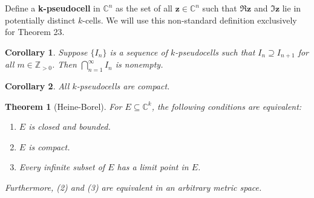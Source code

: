 \documentclass[11pt]{article}
\renewcommand{\vec}[1]{\mathbf{#1}}
\newtheorem{theorem}{Theorem}
\newtheorem{corollary}{Corollary}
\begin{document}
Define a \textbf{k-pseudocell} in $\mathbb{C}^{n}$ as the set of all $\vec{z} \in \mathbb{C}^{n}$ such that $\Re \vec{z}$ and $\Im \vec{z}$ lie in potentially distinct $k$-cells. We will use this non-standard definition exclusively for Theorem 23.

\begin{corollary}
	Suppose $\{ I_{n} \}$ is a sequence of $k$-pseudocells such that $I_{n} \supseteq I_{n + 1}$ for all $m \in \mathbb{Z}_{> 0}$. Then $\bigcap_{n = 1}^{\infty} I_{n}$ is nonempty.
\end{corollary}

\begin{corollary}
	All $k$-pseudocells are compact.
\end{corollary}

\newpage

\begin{theorem}[Heine-Borel]
	For $E \subseteq \mathbb{C}^{k}$, the following conditions are equivalent:
	\begin{enumerate}
		\item $E$ is closed and bounded.
		\item $E$ is compact.
		\item Every infinite subset of $E$ has a limit point in $E$.
	\end{enumerate}
	Furthermore, (2) and (3) are equivalent in an arbitrary metric space.
\end{theorem}
\end{document}
